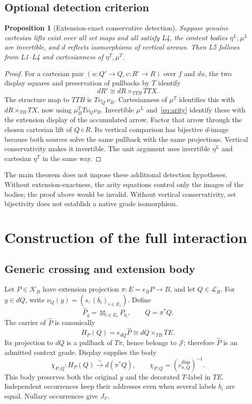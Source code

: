 \documentclass[11pt,a4paper]{article}
\newtheorem{proposition}[theorem]{Proposition}
\theoremstyle{definition}
\newcommand{\V}{\mathcal V}
\newcommand{\Lcat}{\mathcal L}
\newcommand{\K}{\mathcal K}
\newcommand{\J}{\mathcal J}
\newcommand{\diamondc}{\mathbin{\diamond}}
\begin{document}
\subsection{Optional detection criterion}
\begin{proposition}[Extension-exact conservative detection]\label{prop:detect}
Suppose genuine cartesian lifts exist over all set maps and all satisfy L4,
the content bodies $\eta^L,\mu^L$ are
invertible, and $d$ reflects isomorphisms of vertical arrows. Then L5 follows
from L1--L4 and cartesianness of $\eta^T,\mu^T$.
\end{proposition}
\begin{proof}
For a cartesian pair $(u:Q'\to Q,v:R'\to R)$ over $f$ and $du$, the two
display squares and preservation of pullbacks by $T$ identify
\[
 dR'\cong dR\times_{TTB}TTX.
\]
The structure map to $TTB$ is $T\nu_Q\,\nu_R$. Cartesianness of $\mu^T$
identifies this with $dR\times_{TB}TX$, now using
$\mu^T_B T\nu_Q\nu_R$. Invertible $\mu^L$ and~\eqref{eq:arity} identify
these with the extension display of the accumulated arrow. Factor that arrow
through the chosen cartesian lift of $Q\diamondc R$. Its vertical comparison
has bijective $d$-image because both sources solve the same pullback with the
same projections. Vertical conservativity makes it invertible. The unit
argument uses invertible $\eta^L$ and cartesian $\eta^T$ in the same way.
\end{proof}
The main theorem does not impose these additional detection hypotheses.
Without extension-exactness, the arity equations control only the images of
the bodies; the proof above would be invalid. Without vertical conservativity,
set bijectivity does not establish a native grade isomorphism.

\section{Construction of the full interaction}\label{sec:law}

\subsection{Generic crossing and extension body}
Let $P\in\K_B$ have extension projection $\pi:E=e_BP\to B$, and let
$Q\in\Lcat_B$. For $y\in dQ$, write
$\nu_Q(y)=(s,(b_i)_{i\in E_s})$. Define
\begin{equation}\label{eq:crossing}
 \widehat P_y=\boxtimes_{i\in E_s}P_{b_i},\qquad
 \widehat Q=\pi^*Q.
\end{equation}
The carrier of $\widehat P$ is canonically
\begin{equation}\label{eq:H}
 H_P(Q)=e_{dQ}\widehat P
 \cong dQ\times_{TB}TE.
\end{equation}
Its projection to $dQ$ is a pullback of $T\pi$, hence belongs to $\J$;
therefore $\widehat P$ is an admitted context grade. Display supplies the body
\[
 \chi_{P,Q}:H_P(Q)\xrightarrow{\sim}d(\pi^*Q),
 \qquad \chi_{P,Q}=(c^{\mathrm{disp}}_{\pi,Q})^{-1}.
\]
This body preserves both the original $y$ and the decorated $T$-label in $TE$.
Independent occurrences keep their addresses even when several labels $b_i$
are equal. Nullary occurrences give $J_\V$.
\end{document}
